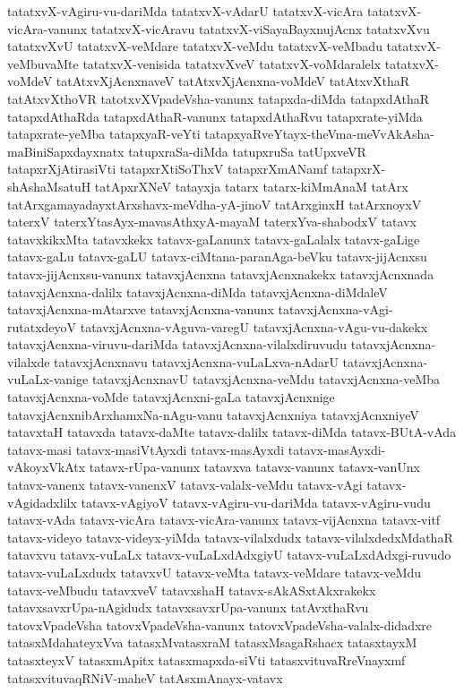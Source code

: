 {tatatxvX-vAgiru-vu-dariMda
tatatxvX-vAdarU
tatatxvX-vicAra
tatatxvX-vicAra-vanunx
tatatxvX-vicAravu
tatatxvX-viSayaBayxnujAcnx
tatatxvXvu
tatatxvXvU
tatatxvX-veMdare
tatatxvX-veMdu
tatatxvX-veMbadu
tatatxvX-veMbuvaMte
tatatxvX-venisida
tatatxvXveV
tatatxvX-voMdaralelx
tatatxvX-voMdeV
tatAtxvXjAcnxnaveV
tatAtxvXjAcnxna-voMdeV
tatAtxvXthaR
tatAtxvXthoVR
tatotxvXVpadeVsha-vanunx
tatapxda-diMda
tatapxdAthaR
tatapxdAthaRda
tatapxdAthaR-vanunx
tatapxdAthaRvu
tatapxrate-yiMda
tatapxrate-yeMba
tatapxyaR-veYti
tatapxyaRveYtayx-theVma-meVvAkAsha-maBiniSapxdayxnatx
tatupxraSa-diMda
tatupxruSa
tatUpxveVR
tatapxrXjAtirasiVti
tatapxrXtiSoThxV
tatapxrXmANamf
tatapxrX-shAshaMsatuH
tatApxrXNeV
tatayxja
tatarx
tatarx-kiMmAnaM
tatArx
tatArxgamayadayxtArxshavx-meVdha-yA-jinoV
tatArxginxH
tatArxnoyxV
taterxV
taterxYtasAyx-mavasAthxyA-mayaM
taterxYva-shabodxV
tatavx
tatavxkikxMta
tatavxkekx
tatavx-gaLanunx
tatavx-gaLalalx
tatavx-gaLige
tatavx-gaLu
tatavx-gaLU
tatavx-ciMtana-paranAga-beVku
tatavx-jijAcnxsu
tatavx-jijAcnxsu-vanunx
tatavxjAcnxna
tatavxjAcnxnakekx
tatavxjAcnxnada
tatavxjAcnxna-dalilx
tatavxjAcnxna-diMda
tatavxjAcnxna-diMdaleV
tatavxjAcnxna-mAtarxve
tatavxjAcnxna-vanunx
tatavxjAcnxna-vAgi-rutatxdeyoV
tatavxjAcnxna-vAguva-varegU
tatavxjAcnxna-vAgu-vu-dakekx
tatavxjAcnxna-viruvu-dariMda
tatavxjAcnxna-vilalxdiruvudu
tatavxjAcnxna-vilalxde
tatavxjAcnxnavu
tatavxjAcnxna-vuLaLxva-nAdarU
tatavxjAcnxna-vuLaLx-vanige
tatavxjAcnxnavU
tatavxjAcnxna-veMdu
tatavxjAcnxna-veMba
tatavxjAcnxna-voMde
tatavxjAcnxni-gaLa
tatavxjAcnxnige
tatavxjAcnxnibArxhamxNa-nAgu-vanu
tatavxjAcnxniya
tatavxjAcnxniyeV
tatavxtaH
tatavxda
tatavx-daMte
tatavx-dalilx
tatavx-diMda
tatavx-BUtA-vAda
tatavx-masi
tatavx-masiVtAyxdi
tatavx-masAyxdi
tatavx-masAyxdi-vAkoyxVkAtx
tatavx-rUpa-vanunx
tatavxva
tatavx-vanunx
tatavx-vanUnx
tatavx-vanenx
tatavx-vanenxV
tatavx-valalx-veMdu
tatavx-vAgi
tatavx-vAgidadxlilx
tatavx-vAgiyoV
tatavx-vAgiru-vu-dariMda
tatavx-vAgiru-vudu
tatavx-vAda
tatavx-vicAra
tatavx-vicAra-vanunx
tatavx-vijAcnxna
tatavx-vitf
tatavx-videyo
tatavx-videyx-yiMda
tatavx-vilalxdudx
tatavx-vilalxdedxMdathaR
tatavxvu
tatavx-vuLaLx
tatavx-vuLaLxdAdxgiyU
tatavx-vuLaLxdAdxgi-ruvudo
tatavx-vuLaLxdudx
tatavxvU
tatavx-veMta
tatavx-veMdare
tatavx-veMdu
tatavx-veMbudu
tatavxveV
tatavxshaH
tatavx-sAkASxtAkxrakekx
tatavxsavxrUpa-nAgidudx
tatavxsavxrUpa-vanunx
tatAvxthaRvu
tatovxVpadeVsha
tatovxVpadeVsha-vanunx
tatovxVpadeVsha-valalx-didadxre
tatasxMdahateyxVva
tatasxMvatasxraM
tatasxMsagaRshacx
tatasxtayxM
tatasxteyxV
tatasxmApitx
tatasxmapxda-siVti
tatasxvituvaRreVnayxmf
tatasxvituvaqRNiV-maheV
tatAsxmAnayx-vatavx
}
